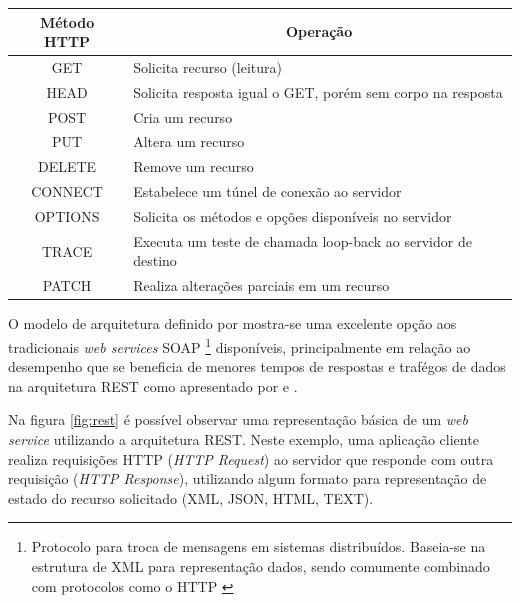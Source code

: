 \begin{table}[H]
\begin{tabular}{c|l}
\textbf{Método HTTP} & \multicolumn{1}{c}{\textbf{Operação}}                        \\ \hline
GET                  & Solicita recurso (leitura)                                   \\
HEAD                 & Solicita resposta igual o GET, porém sem corpo na resposta   \\
POST                 & Cria um recurso                                              \\
PUT                  & Altera um recurso                                            \\
DELETE               & Remove um recurso                                            \\
CONNECT              & Estabelece um túnel de conexão ao servidor                   \\
OPTIONS              & Solicita os métodos e opções disponíveis no servidor         \\
TRACE                & Executa um teste de chamada loop-back ao servidor de destino \\
PATCH                & Realiza alterações parciais em um recurso                  \label{table:metodoHttp} 
\end{tabular}
\end{table}

O modelo de arquitetura definido por  mostra-se uma excelente opção aos tradicionais \textit{web services} SOAP \footnote{Protocolo para troca de mensagens em sistemas distribuídos. Baseia-se na estrutura de XML para representação dados, sendo comumente combinado com protocolos como o HTTP \cite{box2000simple}} disponíveis, principalmente em relação ao desempenho que se beneficia de menores tempos de respostas e trafégos de dados na arquitetura REST como apresentado por  e .
	
Na figura \ref{fig:rest} é possível observar uma representação básica de um \textit{web service} utilizando a arquitetura REST. Neste exemplo, uma aplicação cliente realiza requisições HTTP (\textit{HTTP Request}) ao servidor que responde com outra requisição (\textit{HTTP Response}), utilizando algum formato para representação de estado do recurso solicitado (XML, JSON, HTML, TEXT).

